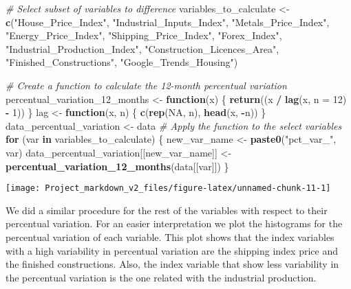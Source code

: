 \documentclass[
]{article}
\newenvironment{Shaded}{\begin{snugshade}}{\end{snugshade}}
\newcommand{\AttributeTok}[1]{\textcolor[rgb]{0.13,0.29,0.53}{#1}}
\newcommand{\CommentTok}[1]{\textcolor[rgb]{0.56,0.35,0.01}{\textit{#1}}}
\newcommand{\ConstantTok}[1]{\textcolor[rgb]{0.56,0.35,0.01}{#1}}
\newcommand{\ControlFlowTok}[1]{\textcolor[rgb]{0.13,0.29,0.53}{\textbf{#1}}}
\newcommand{\DecValTok}[1]{\textcolor[rgb]{0.00,0.00,0.81}{#1}}
\newcommand{\FunctionTok}[1]{\textcolor[rgb]{0.13,0.29,0.53}{\textbf{#1}}}
\newcommand{\NormalTok}[1]{#1}
\newcommand{\OtherTok}[1]{\textcolor[rgb]{0.56,0.35,0.01}{#1}}
\newcommand{\SpecialCharTok}[1]{\textcolor[rgb]{0.81,0.36,0.00}{\textbf{#1}}}
\newcommand{\StringTok}[1]{\textcolor[rgb]{0.31,0.60,0.02}{#1}}
\begin{document}
\begin{Shaded}
\begin{Highlighting}[]
\CommentTok{\# Select subset of variables to difference}
\NormalTok{variables\_to\_calculate }\OtherTok{\textless{}{-}} \FunctionTok{c}\NormalTok{(}\StringTok{"House\_Price\_Index"}\NormalTok{, }\StringTok{"Industrial\_Inputs\_Index"}\NormalTok{, }\StringTok{"Metals\_Price\_Index"}\NormalTok{,}
                            \StringTok{"Energy\_Price\_Index"}\NormalTok{, }\StringTok{"Shipping\_Price\_Index"}\NormalTok{, }\StringTok{"Forex\_Index"}\NormalTok{,}
                            \StringTok{"Industrial\_Production\_Index"}\NormalTok{, }\StringTok{"Construction\_Licences\_Area"}\NormalTok{,}
                            \StringTok{"Finished\_Constructions"}\NormalTok{, }\StringTok{"Google\_Trends\_Housing"}\NormalTok{)}

\CommentTok{\# Create a function to calculate the 12{-}month percentual variation}
\NormalTok{percentual\_variation\_12\_months }\OtherTok{\textless{}{-}} \ControlFlowTok{function}\NormalTok{(x) \{}
  \FunctionTok{return}\NormalTok{((x }\SpecialCharTok{/} \FunctionTok{lag}\NormalTok{(x, }\AttributeTok{n =} \DecValTok{12}\NormalTok{) }\SpecialCharTok{{-}} \DecValTok{1}\NormalTok{))}
\NormalTok{\}}
\NormalTok{lag }\OtherTok{\textless{}{-}} \ControlFlowTok{function}\NormalTok{(x, n) \{}
  \FunctionTok{c}\NormalTok{(}\FunctionTok{rep}\NormalTok{(}\ConstantTok{NA}\NormalTok{, n), }\FunctionTok{head}\NormalTok{(x, }\SpecialCharTok{{-}}\NormalTok{n))}
\NormalTok{\}}
\NormalTok{data\_percentual\_variation }\OtherTok{\textless{}{-}}\NormalTok{ data}
\CommentTok{\# Apply the function to the select variables}
\ControlFlowTok{for}\NormalTok{ (var }\ControlFlowTok{in}\NormalTok{ variables\_to\_calculate) \{}
\NormalTok{  new\_var\_name }\OtherTok{\textless{}{-}} \FunctionTok{paste0}\NormalTok{(}\StringTok{"pct\_var\_"}\NormalTok{, var)}
\NormalTok{  data\_percentual\_variation[[new\_var\_name]] }\OtherTok{\textless{}{-}} \FunctionTok{percentual\_variation\_12\_months}\NormalTok{(data[[var]])}
\NormalTok{\}}
\end{Highlighting}
\end{Shaded}

\begin{center}\texttt{[image: Project\_markdown\_v2\_files/figure-latex/unnamed-chunk-11-1]} \end{center}

We did a similar procedure for the rest of the variables with respect to
their percentual variation. For an easier interpretation we plot the
histograms for the percentual variation of each variable. This plot
shows that the index variables with a high variability in percentual
variation are the shipping index price and the finished constructions.
Also, the index variable that show less variability in the percentual
variation is the one related with the industrial production.
\end{document}
